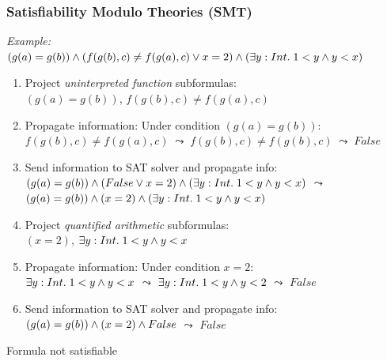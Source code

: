 \documentclass{beamer}
\begin{document}
\begin{frame}[fragile]\frametitle{Satisfiability Modulo Theories (SMT)}

  \emph{Example:}\\
$(g(a) = g(b)) \wedge (f(g(b), c) \neq f(g(a), c) \vee x = 2) \wedge (\exists y:Int.\; 1 < y \wedge y < x)$

\begin{enumerate}
\item Project \emph{uninterpreted function} subformulas:\\
  $(g(a) = g(b))$,  $f(g(b), c) \neq f(g(a), c)$
\item Propagate information: Under condition $(g(a) = g(b))$:\\
  $f(g(b), c) \neq f(g(a), c) \; \leadsto \; f(g(b), c) \neq f(g(b), c) \;
  \leadsto \; False$
\item Send information to SAT solver and propagate info:\\
  $(g(a) = g(b)) \wedge (False \vee x = 2) \wedge (\exists y:Int.\; 1 < y \wedge y < x)$ $\leadsto$\\
  $(g(a) = g(b)) \wedge (x = 2) \wedge (\exists y:Int.\; 1 < y \wedge y < x)$ 
\item Project \emph{quantified arithmetic} subformulas:\\
  $(x = 2)$, $\exists y:Int.\; 1 < y \wedge y < x$
\item Propagate information: Under condition $x = 2$:\\
  $\exists y:Int.\; 1 < y \wedge y < x$ \hspace{3mm} $\leadsto$ \hspace{3mm}
  $\exists y:Int.\; 1 < y \wedge y < 2$ \hspace{3mm} $\leadsto$ \hspace{3mm} $False$
\item Send information to SAT solver and propagate info:\\
  $(g(a) = g(b)) \wedge (x = 2) \wedge False$ \hspace{3mm} $\leadsto$ \hspace{3mm} $False$
\end{enumerate}
Formula not satisfiable

\end{frame}
\end{document}
